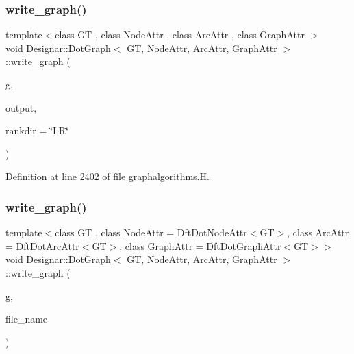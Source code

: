 \subsubsection{\texorpdfstring{write\+\_\+graph()}{write\_graph()}\hspace{0.1cm}{\footnotesize\ttfamily [1/2]}}
{\footnotesize\ttfamily template$<$class GT , class Node\+Attr , class Arc\+Attr , class Graph\+Attr $>$ \\
void \hyperlink{class_designar_1_1_dot_graph}{Designar\+::\+Dot\+Graph}$<$ \hyperlink{demo-buildgraph_8_c_a3001c40d2c31ca87ed96cd7d1334a55e}{GT}, Node\+Attr, Arc\+Attr, Graph\+Attr $>$\+::write\+\_\+graph (\begin{DoxyParamCaption}\item[{const \hyperlink{demo-buildgraph_8_c_a3001c40d2c31ca87ed96cd7d1334a55e}{GT} \&}]{g,  }\item[{std\+::ofstream \&}]{output,  }\item[{const std\+::string \&}]{rankdir = {\ttfamily \char`\"{}LR\char`\"{}} }\end{DoxyParamCaption})}



Definition at line 2402 of file graphalgorithms.\+H.

\mbox{\label{class_designar_1_1_dot_graph_a6f2b98b76d2c970ad875a59388f693cb}} 
\subsubsection{\texorpdfstring{write\+\_\+graph()}{write\_graph()}\hspace{0.1cm}{\footnotesize\ttfamily [2/2]}}
{\footnotesize\ttfamily template$<$class GT , class Node\+Attr  = Dft\+Dot\+Node\+Attr$<$\+G\+T$>$, class Arc\+Attr  = Dft\+Dot\+Arc\+Attr$<$\+G\+T$>$, class Graph\+Attr  = Dft\+Dot\+Graph\+Attr$<$\+G\+T$>$$>$ \\
void \hyperlink{class_designar_1_1_dot_graph}{Designar\+::\+Dot\+Graph}$<$ \hyperlink{demo-buildgraph_8_c_a3001c40d2c31ca87ed96cd7d1334a55e}{GT}, Node\+Attr, Arc\+Attr, Graph\+Attr $>$\+::write\+\_\+graph (\begin{DoxyParamCaption}\item[{const \hyperlink{demo-buildgraph_8_c_a3001c40d2c31ca87ed96cd7d1334a55e}{GT} \&}]{g,  }\item[{const std\+::string \&}]{file\+\_\+name }\end{DoxyParamCaption})\hspace{0.3cm}{\ttfamily [inline]}}



